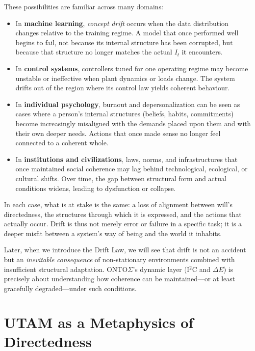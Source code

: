\documentclass[12pt,a4paper]{report}
\newcommand{\Struct}{E}
\begin{document}
These possibilities are familiar across many domains:

\begin{itemize}[leftmargin=2em]
    \item In \textbf{machine learning}, \emph{concept drift} occurs when the data distribution changes relative to the training regime. A model that once performed well begins to fail, not because its internal structure has been corrupted, but because that structure no longer matches the actual $I_t$ it encounters.
    \item In \textbf{control systems}, controllers tuned for one operating regime may become unstable or ineffective when plant dynamics or loads change. The system drifts out of the region where its control law yields coherent behaviour.
    \item In \textbf{individual psychology}, burnout and depersonalization can be seen as cases where a person's internal structures (beliefs, habits, commitments) become increasingly misaligned with the demands placed upon them and with their own deeper needs. Actions that once made sense no longer feel connected to a coherent whole.
    \item In \textbf{institutions and civilizations}, laws, norms, and infrastructures that once maintained social coherence may lag behind technological, ecological, or cultural shifts. Over time, the gap between structural form and actual conditions widens, leading to dysfunction or collapse.
\end{itemize}

In each case, what is at stake is the same: a loss of alignment between will's directedness, the structures through which it is expressed, and the actions that actually occur. Drift is thus not merely error or failure in a specific task; it is a deeper misfit between a system's way of being and the world it inhabits.

Later, when we introduce the Drift Law, we will see that drift is not an accident but an \emph{inevitable consequence} of non-stationary environments combined with insufficient structural adaptation. ONTO$\Sigma$'s dynamic layer (I$^2$C and $\Delta \Struct$) is precisely about understanding how coherence can be maintained---or at least gracefully degraded---under such conditions.

\section{UTAM as a Metaphysics of Directedness}
\end{document}
